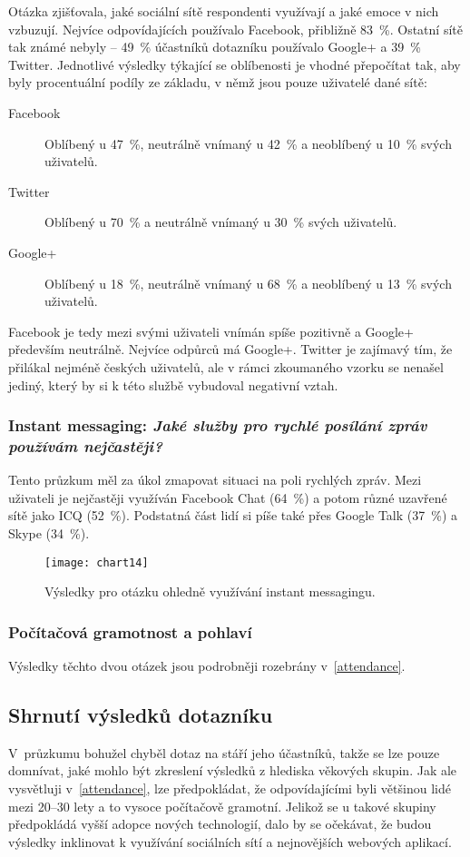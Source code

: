 \documentclass[12pt,oneside,final]{fithesis2}
\begin{document}
Otázka zjišťovala, jaké sociální sítě respondenti využívají a jaké emoce v nich vzbuzují. Nejvíce odpovídajících používalo Facebook, přibližně 83~\%. Ostatní sítě tak známé nebyly -- 49~\% účastníků dotazníku používalo Google+ a 39~\% Twitter. Jednotlivé výsledky týkající se oblíbenosti je vhodné přepočítat tak, aby byly procentuální podíly ze základu, v němž jsou pouze uživatelé dané sítě:

\begin{description}
    \item[Facebook] Oblíbený u 47~\%, neutrálně vnímaný u 42~\% a neoblíbený u 10~\% svých uživatelů.
    \item[Twitter] Oblíbený u 70~\% a neutrálně vnímaný u 30~\% svých uživatelů.
    \item[Google+] Oblíbený u 18~\%, neutrálně vnímaný u 68~\% a neoblíbený u 13~\% svých uživatelů.
\end{description}

Facebook je tedy mezi svými uživateli vnímán spíše pozitivně a Google+ především neutrálně. Nejvíce odpůrců má Google+. Twitter je zajímavý tím, že přilákal nejméně českých uživatelů, ale v rámci zkoumaného vzorku se nenašel jediný, který by si k této službě vybudoval negativní vztah.

\subsubsection*{\textbf{Instant messaging:} \emph{Jaké služby pro rychlé posílání zpráv používám nejčastěji?}}
Tento průzkum měl za úkol zmapovat situaci na poli rychlých zpráv. Mezi uživateli je nejčastěji využíván Facebook Chat (64~\%) a potom různé uzavřené sítě jako ICQ (52~\%). Podstatná část lidí si píše také přes Google Talk (37~\%) a Skype (34~\%).

\begin{figure}[H]
    \centering
    \texttt{[image: chart14]}
    \caption{Výsledky pro otázku ohledně využívání instant messagingu.}
\end{figure}

\subsubsection*{\textbf{Počítačová gramotnost a pohlaví}}
Výsledky těchto dvou otázek jsou podrobněji rozebrány v~\ref{attendance}.

\subsection{Shrnutí výsledků dotazníku}\label{pollResults}
V~průzkumu bohužel chyběl dotaz na stáří jeho účastníků, takže se lze pouze domnívat, jaké mohlo být zkreslení výsledků z hlediska věkových skupin. Jak ale vysvětluji v~\ref{attendance}, lze předpokládat, že odpovídajícími byli většinou lidé mezi 20--30 lety a to vysoce počítačově gramotní. Jelikož se u takové skupiny předpokládá vyšší adopce nových technologií, dalo by se očekávat, že budou výsledky inklinovat k využívání sociálních sítí a nejnovějších webových aplikací.
\end{document}
